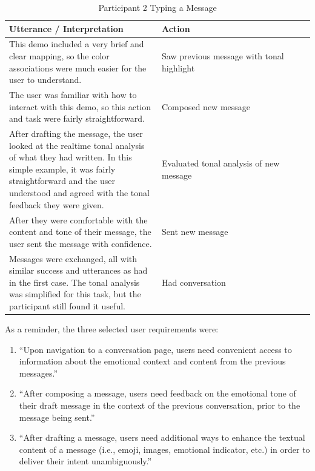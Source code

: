 \documentclass[acmsmall,screen,authorversion,nonacm]{acmart}
\begin{document}
    \begin{table}
        \begin{tabular}{|p{0.5 \linewidth}|p{0.5 \linewidth}|}
        \hline
        Utterance / Interpretation                                                                                                                                                                                                             & Action                                    \\ \hline
        This demo included a very brief and clear mapping, so the color associations were much easier for the user to understand.                                                                                                              & Saw previous message with tonal highlight \\ \hline
        The user was familiar with how to interact with this demo, so this action and task were fairly straightforward.                                                                                                                        & Composed new message                      \\ \hline
        After drafting the message, the user looked at the realtime tonal analysis of what they had written. In this simple example, it was fairly straightforward and the user understood and agreed with the tonal feedback they were given. & Evaluated tonal analysis of new message   \\ \hline
        After they were comfortable with the content and tone of their message, the user sent the message with confidence.                                                                                                                     & Sent new message                          \\ \hline
        Messages were exchanged, all with similar success and utterances as had in the first case. The tonal analysis was simplified for this task, but the participant still found it useful.                                                 & Had conversation                          \\ \hline
    \end{tabular}
    \caption{Participant 2 Typing a Message}
    \label{tab:SimpUser2Task2}
\end{table}

As a reminder, the three selected user requirements were: 

\begin{enumerate}
    \item “Upon navigation to a conversation page, users need convenient access to information about the emotional context and content from the previous messages.”
    \item “After composing a message, users need feedback on the emotional tone of their draft message in the context of the previous conversation, prior to the message being sent.”
    \item “After drafting a message, users need additional ways to enhance the textual content of a message (i.e., emoji, images, emotional indicator, etc.) in order to deliver their intent unambiguously.”
\end{enumerate}
\end{document}
